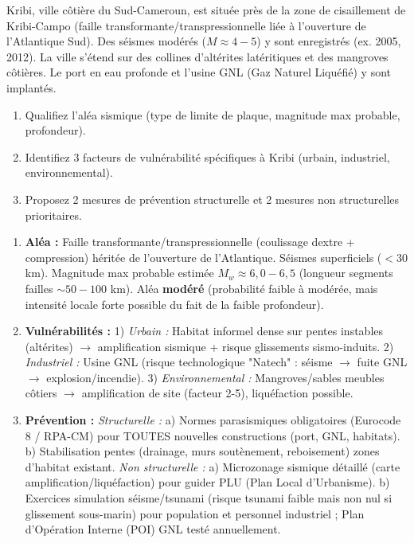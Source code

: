 \documentclass[11pt]{article}
\begin{document}
\begin{exercice}
Kribi, ville côtière du Sud-Cameroun, est située près de la zone de cisaillement de Kribi-Campo (faille transformante/transpressionnelle liée à l'ouverture de l'Atlantique Sud). Des séismes modérés ($M \approx 4-5$) y sont enregistrés (ex. 2005, 2012). La ville s'étend sur des collines d'altérites latéritiques et des mangroves côtières. Le port en eau profonde et l'usine GNL (Gaz Naturel Liquéfié) y sont implantés.
\begin{enumerate}
    \item Qualifiez l'aléa sismique (type de limite de plaque, magnitude max probable, profondeur).
    \item Identifiez 3 facteurs de vulnérabilité spécifiques à Kribi (urbain, industriel, environnemental).
    \item Proposez 2 mesures de prévention structurelle et 2 mesures non structurelles prioritaires.
\end{enumerate}
\end{exercice}

\begin{corrige}
\begin{enumerate}
    \item \textbf{Aléa :} Faille transformante/transpressionnelle (coulissage dextre + compression) héritée de l'ouverture de l'Atlantique. Séismes superficiels ($< 30$ km). Magnitude max probable estimée $M_w \approx 6,0-6,5$ (longueur segments failles $\sim 50-100$ km). Aléa \textbf{modéré} (probabilité faible à modérée, mais intensité locale forte possible du fait de la faible profondeur).
    \item \textbf{Vulnérabilités :} 1) \textit{Urbain :} Habitat informel dense sur pentes instables (altérites) $\rightarrow$ amplification sismique + risque glissements sismo-induits. 2) \textit{Industriel :} Usine GNL (risque technologique "Natech" : séisme $\rightarrow$ fuite GNL $\rightarrow$ explosion/incendie). 3) \textit{Environnemental :} Mangroves/sables meubles côtiers $\rightarrow$ amplification de site (facteur 2-5), liquéfaction possible.
    \item \textbf{Prévention :} \textit{Structurelle :} a) Normes parasismiques obligatoires (Eurocode 8 / RPA-CM) pour TOUTES nouvelles constructions (port, GNL, habitats). b) Stabilisation pentes (drainage, murs soutènement, reboisement) zones d'habitat existant. \textit{Non structurelle :} a) Microzonage sismique détaillé (carte amplification/liquéfaction) pour guider PLU (Plan Local d'Urbanisme). b) Exercices simulation séisme/tsunami (risque tsunami faible mais non nul si glissement sous-marin) pour population et personnel industriel ; Plan d'Opération Interne (POI) GNL testé annuellement.
\end{enumerate}
\end{corrige}
\end{document}
